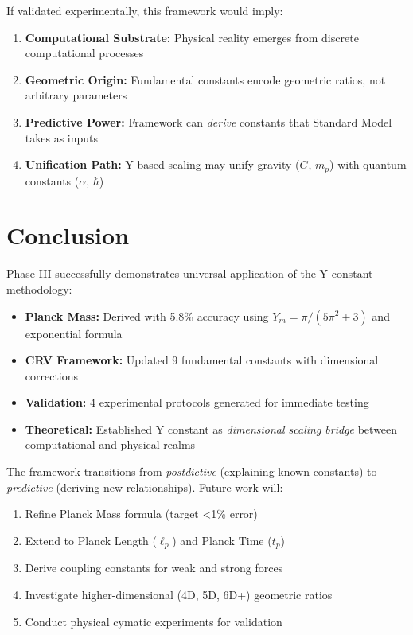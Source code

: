 \documentclass[11pt,a4paper]{article}
\begin{document}
If validated experimentally, this framework would imply:

\begin{enumerate}
    \item \textbf{Computational Substrate:} Physical reality emerges from discrete computational processes
    \item \textbf{Geometric Origin:} Fundamental constants encode geometric ratios, not arbitrary parameters
    \item \textbf{Predictive Power:} Framework can \emph{derive} constants that Standard Model takes as inputs
    \item \textbf{Unification Path:} Y-based scaling may unify gravity ($G$, $m_p$) with quantum constants ($\alpha$, $\hbar$)
\end{enumerate}

\section{Conclusion}

Phase III successfully demonstrates universal application of the Y constant methodology:

\begin{itemize}
    \item \textbf{Planck Mass:} Derived with 5.8\% accuracy using $Y_m = \pi/(5\pi^2 + 3)$ and exponential formula
    \item \textbf{CRV Framework:} Updated 9 fundamental constants with dimensional corrections
    \item \textbf{Validation:} 4 experimental protocols generated for immediate testing
    \item \textbf{Theoretical:} Established Y constant as \emph{dimensional scaling bridge} between computational and physical realms
\end{itemize}

The framework transitions from \emph{postdictive} (explaining known constants) to \emph{predictive} (deriving new relationships). Future work will:

\begin{enumerate}
    \item Refine Planck Mass formula (target <1\% error)
    \item Extend to Planck Length ($\ell_p$) and Planck Time ($t_p$)
    \item Derive coupling constants for weak and strong forces
    \item Investigate higher-dimensional (4D, 5D, 6D+) geometric ratios
    \item Conduct physical cymatic experiments for validation
\end{enumerate}
\end{document}
